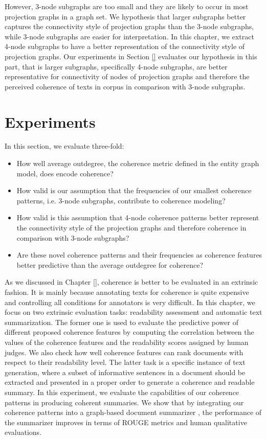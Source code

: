 However, 3-node subgraphs are too small and they are likely to occur in most projection graphs in a graph set. 
We hypothesis that larger subgraphs better captures the connectivity style of projection graphs than the 3-node subgraphs, while 3-node subgraphs are easier for interpretation. 
In this chapter, we extract 4-node subgraphs to have a better representation of the connectivity style of projection graphs. 
Our experiments in Section \ref{} evaluates our hypothesis in this part, that is larger subgraphs, specifically 4-node subgraphs, are better representative for connectivity of nodes of projection graphs and therefore the perceived coherence of texts in corpus in comparison with 3-node subgraphs.


\section{Experiments}
\label{sec:experiments}
%
In this section, we evaluate three-fold:
\begin{itemize}
	\item How well average outdegree, the coherence metric defined in the entity graph model, does encode coherence?
	\item How valid is our assumption that the frequencies of our smallest coherence patterns, i.e. 3-node subgraphs, contribute to coherence modeling?
	\item How valid is this assumption that 4-node coherence patterns better represent the connectivity style of the projection graphs and therefore coherence in comparison with 3-node subgraphs?
	\item Are these novel coherence patterns and their frequencies as coherence features better predictive than the average outdegree for coherence?
\end{itemize}

As we discussed in Chapter \ref{}, coherence is better to be evaluated in an extrinsic fashion. 
It is mainly because annotating texts for coherence is quite expensive and controlling all conditions for annotators is very difficult. 
In this chapter, we focus on two extrinsic evaluation tasks: readability assessment and automatic text summarization. 
The former one is used to evaluate the predictive power of different proposed coherence features by computing the correlation between the values of the coherence features and the readability scores assigned by human judges. 
We also check how well coherence features can rank documents with respect to their readability level. 
The latter task is a specific instance of text generation, where a subset of informative sentences in a document should be extracted and presented in a proper order to generate a coherence and readable summary. 
In this experiment, we evaluate the capabilities of our coherence patterns in producing coherent summaries. 
We show that by integrating our coherence patterns into a graph-based document summarizer \cite{parveen15}, the performance of the summarizer improves in terms of ROUGE metrics and human qualitative evaluations.

